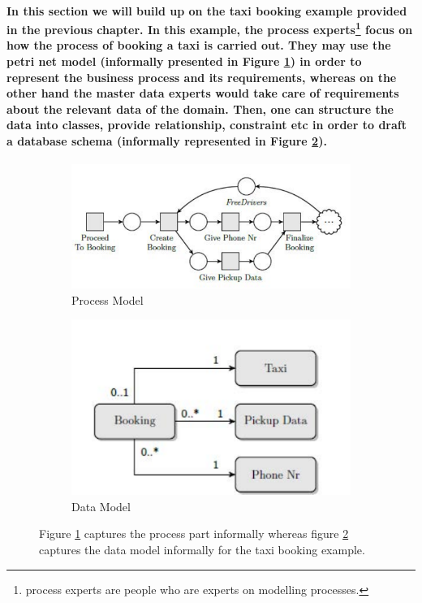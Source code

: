\paragraph*{\textnormal{In this section we will build up on the taxi booking example provided in the previous chapter. In this example, the process experts\footnote{process experts are people who are experts on modelling processes.} focus on how the process of booking a taxi is carried out. They may use the petri net model (informally presented in Figure \ref{fig:DBN_PN_Informal}) in order to represent the business process and its requirements, whereas on the other hand the master data experts would take care of requirements about the relevant data of the domain. Then, one can structure the data into classes, provide relationship, constraint etc in order to draft a database schema (informally represented in Figure \ref{fig:DBN_DataModel_Informal}).}}
\begin{figure}[!htbp]
	\centering
	\begin{subfigure}{0.5\textwidth}
		\centering
		\includegraphics[width=1.0\linewidth]{DBN_PN_Informal.pdf}
		\caption{Process Model}
		\label{fig:DBN_PN_Informal}
	\end{subfigure}%
	\begin{subfigure}{0.5\textwidth}
		\centering
		\includegraphics[width=0.7\linewidth]{DBN_DataModel_Informal.pdf}
		\caption{Data Model}
		\label{fig:DBN_DataModel_Informal}
	\end{subfigure}
	\caption{Figure \ref{fig:DBN_PN_Informal} captures the process part informally whereas figure \ref{fig:DBN_DataModel_Informal} captures the data model informally for the taxi booking example.}
	\label{fig:DBN_informal_model}
\end{figure}

